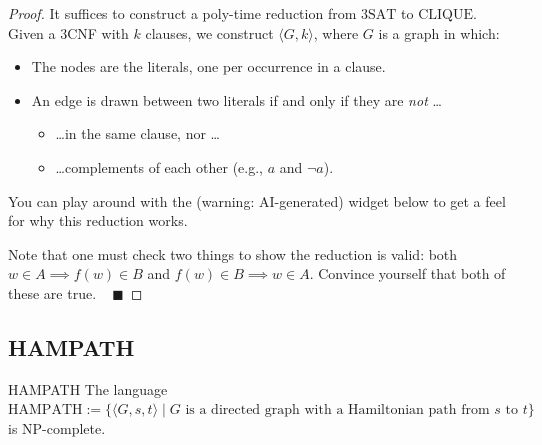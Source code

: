 \begin{proof}
    It suffices to construct a
    poly-time reduction from $\mathrm{3SAT}$ to $\mathrm{CLIQUE}$.
    Given a 3CNF with $k$ clauses, we construct $\langle G, k \rangle$, where $G$ is a graph in which:
    \begin{itemize}
        \item The nodes are the literals, one per occurrence in a clause.
        \item An edge is drawn between two literals if and only if
        they are \emph{not} \dots
        \begin{itemize}
            \item \dots in the same clause, nor \dots
            \item \dots complements of each other
            (e.g., $a$ and $\neg a$).
        \end{itemize}
    \end{itemize}
    You can play around with the (warning: AI-generated) widget below
    to get a feel for why this reduction works.


    Note that one must check two things to show the reduction is valid:
    both $w \in A \implies f(w) \in B$ and $f(w) \in B \implies w \in A$.
    Convince yourself that both of these are true. ~ $\blacksquare$
\end{proof}

\subsection{HAMPATH}

\begin{theorem}{HAMPATH}
    The language $\mathrm{HAMPATH} := \{
        \langle G, s, t \rangle \mid
        G \text{ is a directed graph with a Hamiltonian path from } s \text{ to } t
    \}$ is NP-complete.
\end{theorem}

